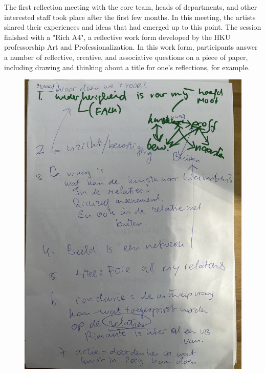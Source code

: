 \documentclass[authordate, empirical,issue]{jote-new-article}
\begin{document}
	{



	The first reflection meeting with the core team, heads of departments, and other interested staff took place after the first few months. In this meeting, the artists shared their experiences and ideas that had emerged up to this point. The session finished with a "Rich A4", a reflective work form developed by the HKU professorship Art and Professionalization. In this work form, participants answer a number of reflective, creative, and associative questions on a piece of paper, including drawing and thinking about a title for one's reflections, for example.







	\begin{figure}
		\includegraphics[angle=270, width=\linewidth]{media/fig1.jpeg}


\end{figure}}
\end{document}
